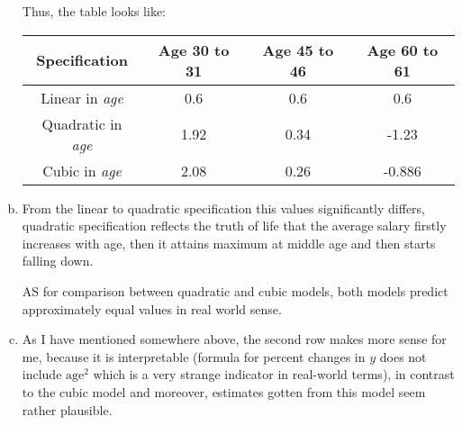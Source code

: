 \documentclass[a4paper]{article}
\begin{document}
\begin{enumerate}[(a)]
Thus, the table looks like:


\begin{table}[H]
	\begin{tabular}{cccc}
		Specification & Age 30 to 31  & Age 45 to 46 & Age 60 to 61 \\
		\hline
		Linear in \textit{age}& 0.6  & 0.6 & 0.6 \\
		Quadratic in \textit{age}  &1.92  &0.34  &-1.23  \\
		Cubic in \textit{age} &2.08  &0.26  &-0.886\\
		\hline 
	\end{tabular}
\end{table}
\item From the linear to quadratic specification this values significantly differs, quadratic specification reflects the truth of life that the average salary firstly increases with age, then it attains maximum at middle age and then starts falling down.

AS for comparison between quadratic and cubic models, both models predict approximately equal values in real world sense.
\item As I have mentioned somewhere above, the second row makes more sense for me, because it is interpretable (formula for percent changes in $y$ does not include $\text{age}^2$ which is a very strange indicator in real-world terms), in contrast to the cubic model and moreover, estimates gotten from this model seem rather plausible.
\end{enumerate}
\end{document}
